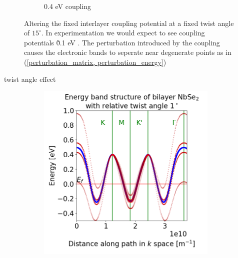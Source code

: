 \documentclass[12pt]{report} %
\begin{document}
\begin{figure}[t]
\begin{subfigure}[b]{0.475\textwidth}
    \caption{0.4 eV coupling}
    \label{bilayer_coupling_0.4}
  \end{subfigure}
  \caption{
    Altering the fixed interlayer coupling potential at a fixed twist angle of $15^\circ$. In experimentation we would expect to see coupling potentials \~ 0.1 eV \cite{}. The perturbation introduced by the coupling causes the electronic bands to seperate near degenerate points as in (\ref{perturbation_matrix, perturbation_energy})
  }
  \label{bilayer_bands_projected_coupling}
\end{figure}

twist angle effect

\begin{figure}[t]
\centering
  \begin{subfigure}[b]{0.475\textwidth}
    \centering
    \includegraphics[width=0.95\textwidth]{1_deg_0.1_coupling.png}
    \caption{}
    \label{bilayer_rotation_1}
  \end{subfigure}
  \hfill
  \begin{subfigure}[b]{0.475\textwidth}
    \centering

\end{subfigure}
\end{figure}
\end{document}
